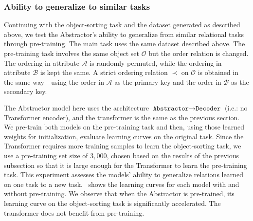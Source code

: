 \subsubsection{Ability to generalize to similar tasks}

Continuing with the object-sorting task and the dataset generated as described above, we test the Abstractor's ability to generalize from similar relational tasks through pre-training. The main task uses the same dataset described above. The pre-training task involves the same object set $\mathcal{O}$ but the order relation is changed. The ordering in attribute $\mathcal{A}$ is randomly permuted, while the ordering in attribute $\mathcal{B}$ is kept the same. A strict ordering relation $\prec$ on $\mathcal{O}$ is obtained in the same way---using the order in $\mathcal{A}$ as the primary key and the order in $\mathcal{B}$ as the secondary key.

The Abstractor model here uses the architecture $\texttt{Abstractor} \to \texttt{Decoder}$ (i.e.: no Transformer
encoder), and the transformer is the same as the previous section. We pre-train both models on the pre-training task
and then, using those learned weights for initialization, evaluate learning curves on the original task. Since the
Transformer requires more training samples to learn the object-sorting task, we use a pre-training set size of $3,000$, chosen based on the results of the previous subsection so that it is large enough for the Transformer to learn the pre-training task. This experiment assesses the models' ability to generalize relations learned on one task to a new task.~ shows the learning curves for each model with and without pre-training. We observe that when the Abstractor is pre-trained, its learning curve on the object-sorting task is significantly accelerated. The transformer does not benefit from pre-training.
